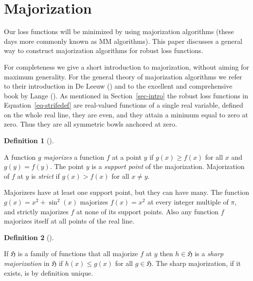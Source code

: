 \documentclass[
  12pt,
  letterpaper,
  DIV=11,
  numbers=noendperiod]{scrartcl}
\newcommand{\sectionbreak}{\pagebreak}
\theoremstyle{definition}
\newtheorem{definition}{Definition}[section]
\theoremstyle{plain}
\theoremstyle{plain}
\theoremstyle{plain}
\theoremstyle{definition}
\theoremstyle{remark}
\begin{document}
\sectionbreak

\section{Majorization}\label{sec-major}

Our loss functions will be minimized by using majorization algorithms
(these days more commonly known as MM algorithms). This paper discusses
a general way to construct majorization algorithms for robust loss
functions.

For completeness we give a short introduction to majorization, without
aiming for maximum generality. For the general theory of majorization
algorithms we refer to their introduction in De Leeuw
() and to the excellent and
comprehensive book by Lange (). As
mentioned in Section~\ref{sec-intro} the robust loss functions in
Equation~\ref{eq-strifedef} are real-valued functions of a single real
variable, defined on the whole real line, they are even, and they attain
a minimum equal to zero at zero. Thus they are all symmetric bowls
anchored at zero.

\begin{definition}[]\protect\hypertarget{def-majorize}{}\label{def-majorize}

A function \(g\) \emph{majorizes} a function \(f\) at a point \(y\) if
\(g(x)\geq f(x)\) for all \(x\) and \(g(y)=f(y)\). The point \(y\) is a
\emph{support point} of the majorization. Majorization of \(f\) at \(y\)
is \emph{strict} if \(g(x)>f(x)\) for all \(x\not= y\).

\end{definition}

Majorizers have at least one support point, but they can have many. The
function \(g(x)=x^2+\sin^2(x)\) majorizes \(f(x)=x^2\) at every integer
multiple of \(\pi\), and strictly majorizes \(f\) at none of its support
points. Also any function \(f\) majorizes itself at all points of the
real line.

\begin{definition}[]\protect\hypertarget{def-sharp}{}\label{def-sharp}

If \(\mathfrak{H}\) is a family of functions that all majorize \(f\) at
\(y\) then \(h\in\mathfrak{H}\) is a \emph{sharp majorization} in
\(\mathfrak{H}\) if \(h(x)\leq g(x)\) for all \(g\in\mathfrak{H}\). The
sharp majorization, if it exists, is by definition unique.

\end{definition}
\end{document}

